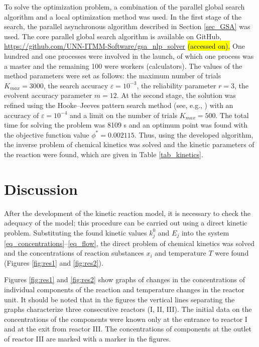 \documentclass[mathematics,article,accept,pdftex,moreauthors]{Definitions/mdpi}
\begin{document}
	To solve the optimization problem, a combination of the parallel global search algorithm and a local optimization method was used. In the first stage of the search, 
	{the parallel asynchronous algorithm described in Section \ref{sec_GSA} was used. The core parallel global search algorithm is available on GitHub, \url{https://github.com/UNN-ITMM-Software/gsa_nlp_solver} \hl{(accessed on).}} %
	One hundred and one processes were involved in the launch, of which one process was a master and the remaining 100 were workers (calculators). The values of the method parameters were set as follows: the maximum number of trials $K_{max}=3000$, the search accuracy $\varepsilon=10^{-3}$, the reliability parameter $r=3$, the evolvent accuracy parameter $m=12$. At the second stage, the solution was refined
	{using the Hooke--Jeeves pattern search method (see, e.g., \cite{HookJeeves})}
	with an accuracy of $\varepsilon=10^{-4}$ and a limit on the number of trials $K_{max}=500$.
	The total time for solving the problem was 8109 s and an optimum point was found with the objective function value $\phi^* = 0.002115$. Thus, using the developed algorithm, the inverse problem of chemical kinetics was solved and the kinetic parameters of the reaction were found, which are given in Table \ref{tab_kinetics}. 
	
	\section{Discussion}\label{sec_discussion}
	
	
	After the development of the kinetic reaction model, it is necessary to check the adequacy of the model; this procedure can be carried out using a direct kinetic problem. Substituting the found kinetic values $k_j^0$ and $E_j$ into the system \eqref{eq_concentrations}--\eqref{eq_flow}, the direct problem of chemical kinetics was solved and the concentrations of reaction substances $x_i$ and temperature $T$ were found (Figures \ref{fig:res1} and \ref{fig:res2}).
	
	Figures \ref{fig:res1} and \ref{fig:res2} show graphs of changes in the concentrations of individual components of the reaction and temperature changes in the reactor unit. It should be noted that in the figures the vertical lines separating the graphs characterize three consecutive reactors (I, II, III).  The initial data on the concentrations of the components were known only at the entrance to reactor I and at the exit from reactor III. The concentrations of components at the outlet of reactor III are marked with a marker in the figures.
	
\end{document}

